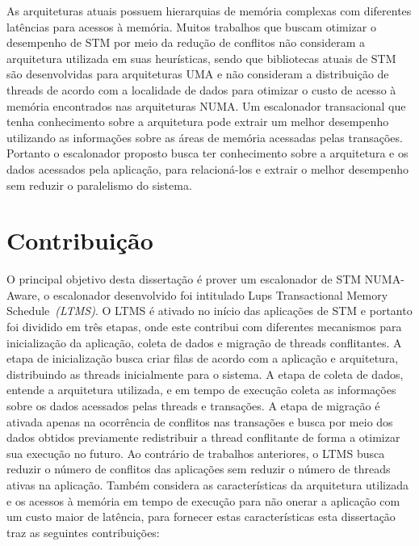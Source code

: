 \documentclass[diss,capa]{texufpel}
\begin{document}
As arquiteturas atuais possuem hierarquias de memória complexas com diferentes latências para acessos à memória. Muitos trabalhos que buscam otimizar o desempenho de STM por meio da redução de conflitos não consideram a arquitetura utilizada em suas heurísticas, sendo que bibliotecas atuais de STM são desenvolvidas para arquiteturas UMA e não consideram a distribuição de threads de acordo com a localidade de dados para otimizar o custo de acesso à memória encontrados nas arquiteturas NUMA. Um escalonador transacional que tenha conhecimento sobre a arquitetura pode extrair um melhor desempenho utilizando as informações sobre as áreas de memória acessadas pelas transações. Portanto o escalonador proposto busca ter conhecimento sobre a arquitetura e os dados acessados pela aplicação, para relacioná-los e extrair o melhor desempenho sem reduzir o paralelismo do sistema.

\section{Contribuição}

O principal objetivo desta dissertação é prover um escalonador de STM NUMA-Aware, o escalonador desenvolvido foi intitulado Lups Transactional Memory Schedule~\emph{(LTMS)}. O LTMS é ativado no início das aplicações de STM e portanto foi dividido em três etapas, onde este contribui com diferentes mecanismos para inicialização da aplicação, coleta de dados e migração de threads conflitantes. A etapa de inicialização busca criar filas de acordo com a aplicação e arquitetura, distribuindo as threads inicialmente para o sistema. A etapa de coleta de dados, entende a arquitetura utilizada, e em tempo de execução coleta as informações sobre os dados acessados pelas threads e transações. A etapa de migração é ativada apenas na ocorrência de conflitos nas transações e busca por meio dos dados obtidos previamente redistribuir a thread conflitante de forma a otimizar sua execução no futuro. Ao contrário de trabalhos anteriores, o LTMS busca reduzir o número de conflitos das aplicações sem reduzir o número de threads ativas na aplicação. Também considera as características da arquitetura utilizada e os acessos à memória em tempo de execução para não onerar a aplicação com um custo maior de latência, para fornecer estas características esta dissertação traz as seguintes contribuições:
\end{document}
